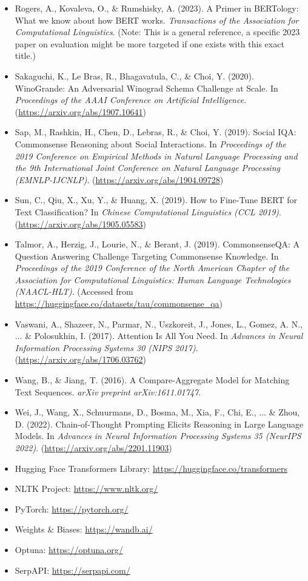 \documentclass[10.5pt]{article}
\begin{document}
\begin{itemize}
    \item Rogers, A., Kovaleva, O., \& Rumshisky, A. (2023). A Primer in BERTology: What we know about how BERT works. \textit{Transactions of the Association for Computational Linguistics}. (Note: This is a general reference, a specific 2023 paper on evaluation might be more targeted if one exists with this exact title.)
    \item Sakaguchi, K., Le Bras, R., Bhagavatula, C., \& Choi, Y. (2020). WinoGrande: An Adversarial Winograd Schema Challenge at Scale. In \textit{Proceedings of the AAAI Conference on Artificial Intelligence}. (\url{https://arxiv.org/abs/1907.10641})
    \item Sap, M., Rashkin, H., Chen, D., Lebras, R., \& Choi, Y. (2019). Social IQA: Commonsense Reasoning about Social Interactions. In \textit{Proceedings of the 2019 Conference on Empirical Methods in Natural Language Processing and the 9th International Joint Conference on Natural Language Processing (EMNLP-IJCNLP)}. (\url{https://arxiv.org/abs/1904.09728})
    \item Sun, C., Qiu, X., Xu, Y., \& Huang, X. (2019). How to Fine-Tune BERT for Text Classification? In \textit{Chinese Computational Linguistics (CCL 2019)}. (\url{https://arxiv.org/abs/1905.05583})
    \item Talmor, A., Herzig, J., Lourie, N., \& Berant, J. (2019). CommonsenseQA: A Question Answering Challenge Targeting Commonsense Knowledge. In \textit{Proceedings of the 2019 Conference of the North American Chapter of the Association for Computational Linguistics: Human Language Technologies (NAACL-HLT)}. (Accessed from \url{https://huggingface.co/datasets/tau/commonsense_qa})
    \item Vaswani, A., Shazeer, N., Parmar, N., Uszkoreit, J., Jones, L., Gomez, A. N., ... \& Polosukhin, I. (2017). Attention Is All You Need. In \textit{Advances in Neural Information Processing Systems 30 (NIPS 2017)}. (\url{https://arxiv.org/abs/1706.03762})
    \item Wang, B., \& Jiang, T. (2016). A Compare-Aggregate Model for Matching Text Sequences. \textit{arXiv preprint arXiv:1611.01747}.
    \item Wei, J., Wang, X., Schuurmans, D., Bosma, M., Xia, F., Chi, E., ... \& Zhou, D. (2022). Chain-of-Thought Prompting Elicits Reasoning in Large Language Models. In \textit{Advances in Neural Information Processing Systems 35 (NeurIPS 2022)}. (\url{https://arxiv.org/abs/2201.11903})
    \item Hugging Face Transformers Library: \url{https://huggingface.co/transformers}
    \item NLTK Project: \url{https://www.nltk.org/}
    \item PyTorch: \url{https://pytorch.org/}
    \item Weights \& Biases: \url{https://wandb.ai/}
    \item Optuna: \url{https://optuna.org/}
    \item SerpAPI: \url{https://serpapi.com/}
\end{itemize}
\end{document}
